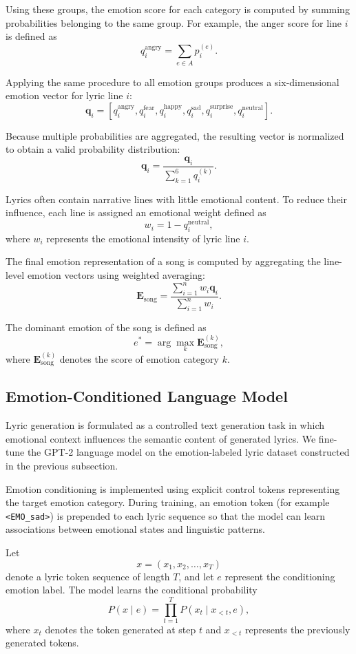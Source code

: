 \documentclass[11pt]{article}
\begin{document}
Using these groups, the emotion score for each category is computed by summing probabilities belonging to the same group. For example, the anger score for line $i$ is defined as
\[
q_i^{\text{angry}} =
\sum_{e \in A} p_i^{(e)}.
\]

Applying the same procedure to all emotion groups produces a six-dimensional emotion vector for lyric line $i$:
\[
\mathbf{q}_i =
\left[
q_i^{\text{angry}},
q_i^{\text{fear}},
q_i^{\text{happy}},
q_i^{\text{sad}},
q_i^{\text{surprise}},
q_i^{\text{neutral}}
\right].
\]

Because multiple probabilities are aggregated, the resulting vector is normalized to obtain a valid probability distribution:
\[
\mathbf{q}_i =
\frac{\mathbf{q}_i}
{\sum_{k=1}^{6} q_i^{(k)}}.
\]

Lyrics often contain narrative lines with little emotional content. To reduce their influence, each line is assigned an emotional weight defined as
\[
w_i = 1 - q_i^{\text{neutral}},
\]
where $w_i$ represents the emotional intensity of lyric line $i$.

The final emotion representation of a song is computed by aggregating the line-level emotion vectors using weighted averaging:
\[
\mathbf{E}_{\text{song}}
=
\frac{\sum_{i=1}^{n} w_i \mathbf{q}_i}
{\sum_{i=1}^{n} w_i}.
\]

The dominant emotion of the song is defined as
\[
e^* =
\arg\max_k
\mathbf{E}_{\text{song}}^{(k)},
\]
where $\mathbf{E}_{\text{song}}^{(k)}$ denotes the score of emotion category $k$.

\subsection{Emotion-Conditioned Language Model}

Lyric generation is formulated as a controlled text generation task in which emotional context influences the semantic content of generated lyrics. We fine-tune the GPT-2 language model \cite{radford2019language} on the emotion-labeled lyric dataset constructed in the previous subsection.

Emotion conditioning is implemented using explicit control tokens representing the target emotion category. During training, an emotion token (for example \texttt{\textless EMO\_sad\textgreater}) is prepended to each lyric sequence so that the model can learn associations between emotional states and linguistic patterns.

Let
\[
x = (x_1, x_2, \dots, x_T)
\]
denote a lyric token sequence of length $T$, and let $e$ represent the conditioning emotion label. The model learns the conditional probability
\[
P(x \mid e)
=
\prod_{t=1}^{T}
P(x_t \mid x_{<t}, e),
\]
where $x_t$ denotes the token generated at step $t$ and $x_{<t}$ represents the previously generated tokens.
\end{document}
